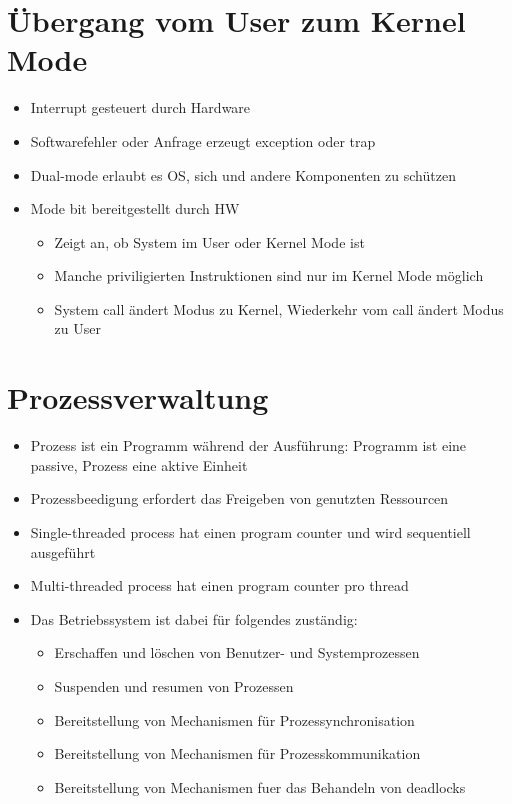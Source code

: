 \documentclass[a4paper]{scrreprt}
\begin{document}
\section{Übergang vom User zum Kernel Mode}
\begin{itemize}
	\item Interrupt gesteuert durch Hardware
	\item Softwarefehler oder Anfrage erzeugt exception oder trap
	\item Dual-mode erlaubt es OS, sich und andere Komponenten zu schützen
	\item Mode bit bereitgestellt durch HW
		\begin{itemize}
			\item Zeigt an, ob System im User oder Kernel Mode ist
			\item Manche priviligierten Instruktionen sind nur im Kernel Mode möglich
			\item System call ändert Modus zu Kernel, Wiederkehr vom call ändert Modus zu User
		\end{itemize}
\end{itemize}

\section{Prozessverwaltung}
\begin{itemize}
	\item Prozess ist ein Programm während der Ausführung: Programm ist eine passive, Prozess eine aktive Einheit
	\item Prozessbeedigung erfordert das Freigeben von genutzten Ressourcen
	\item Single-threaded process hat einen program counter und wird sequentiell ausgeführt
	\item Multi-threaded process hat einen program counter pro thread
	\item Das Betriebssystem ist dabei für folgendes zuständig:
		\begin{itemize}
			\item Erschaffen und löschen von Benutzer- und Systemprozessen
			\item Suspenden und resumen von Prozessen
			\item Bereitstellung von Mechanismen für Prozessynchronisation
			\item Bereitstellung von Mechanismen für Prozesskommunikation
			\item Bereitstellung von Mechanismen fuer das Behandeln von deadlocks
		\end{itemize}
\end{itemize}
\end{document}
